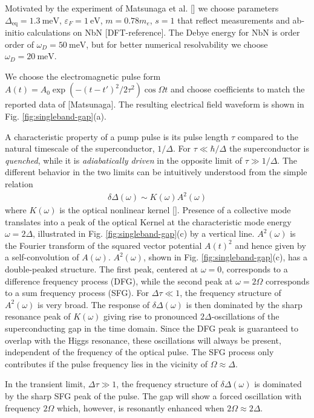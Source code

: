 \documentclass[aps,prb,reprint,noeprint,superscriptaddress]{revtex4-1}
\begin{document}
Motivated by the experiment of Matsunaga et al. [] we choose parameters
$\Delta_{\text{eq}}=\SI{1.3}{\milli\electronvolt}$,
$\varepsilon_{F}=\SI{1}{\electronvolt}$, $m=0.78 m_e$, $s=1$ that reflect
measurements and ab-initio calculations on NbN [DFT-reference].
The Debye energy for NbN is order order of 
$\omega_D = \SI{50}{\milli\electronvolt}$, but
for better numerical resolvability we choose $\omega_D =
\SI{20}{\milli\electronvolt}$.

We choose the electromagnetic pulse form $A(t) = A_0 \exp\left( -(t-t')^2/2\tau^2
\right)\cos \Omega t$ and choose coefficients to match the reported data 
of [Matsunaga]. The resulting
electrical field waveform is shown in Fig. \ref{fig:singleband-gap}(a). 

A characteristic property of a pump pulse is its pulse 
length $\tau$ compared to the natural
timescale of the superconductor, $1/\Delta$. For $\tau \ll \hbar / \Delta$
the superconductor is \textit{quenched}, while it is \textit{adiabatically
driven} in the
opposite limit of $\tau \gg  1 / \Delta$. 
The different behavior in the two limits can be intuitively understood 
from the simple relation
\begin{eqnarray*}
  \delta \Delta(\omega) \sim K(\omega) A^2(\omega)
\end{eqnarray*}
where $K(\omega)$ is the optical nonlinear kernel []. Presence of a collective mode
translates into a peak of the optical Kernel at the characteristic mode energy
$\omega=2\Delta$, illustrated in Fig. \ref{fig:singleband-gap}(c) by a vertical
line.
$A^2(\omega)$  
is the Fourier transform of the squared vector
potential $A(t)^2$ and hence given by a self-convolution of $A(\omega)$. $A^2(\omega)$, shown in Fig. 
\ref{fig:singleband-gap}(c), has a double-peaked structure. The first peak,
centered at $\omega=0$, corresponds to a difference frequency process (DFG),
while the second peak at $\omega=2\Omega$ corresponds to a sum frequency process
(SFG). For $\Delta\tau\ll 1$, the frequency structure of $A^2(\omega)$ is very
broad. The response of $\delta\Delta(\omega)$ is then dominated by the sharp
resonance peak of $K(\omega)$ giving rise to pronounced $2\Delta$-oscillations
of the superconducting gap in the time domain. 
Since the DFG peak is 
guaranteed to overlap with the Higgs resonance,
these oscillations will always be present,
independent of the frequency of the optical pulse. The SFG process only contributes
if the pulse frequency lies in the vicinity of $\Omega \approx \Delta$.

In the transient limit, $\Delta \tau\gg 1$, the frequency structure of
$\delta\Delta(\omega)$ is dominated by the sharp SFG peak of the pulse. The gap
will show a forced oscillation with frequency $2\Omega$ which, however, is
resonantly enhanced when $2\Omega\approx2\Delta$.
\end{document}
